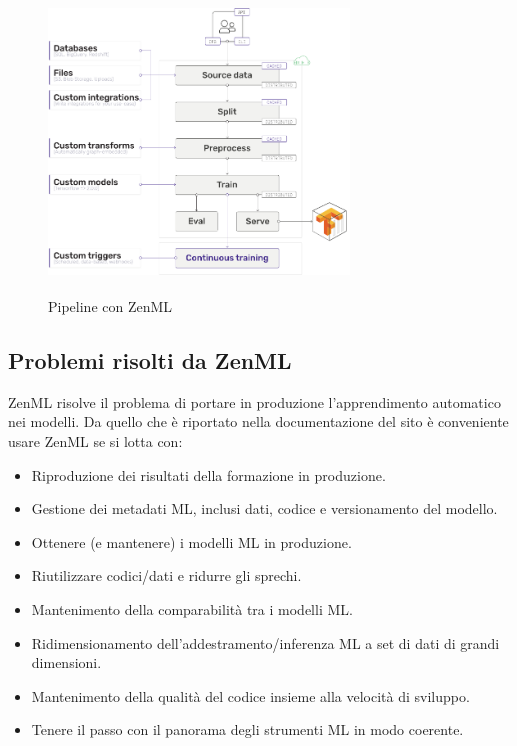 \documentclass[12pt,a4paper]{report}
\begin{document}
\begin{figure}[h!]
    \begin{center}
        \includegraphics[width=8cm,height=8cm,keepaspectratio]{ZenML-schema}
    \end{center}
    \caption{Pipeline con ZenML}
    \label{fig:ZenML-schema}
\end{figure}

\subsection{Problemi risolti da ZenML}
ZenML risolve il problema di portare in produzione l'apprendimento automatico nei modelli. Da quello che è riportato nella documentazione del sito è conveniente usare ZenML se si lotta con: \cite{ZenML}
\begin{itemize}
    \item Riproduzione dei risultati della formazione in produzione.
    \item Gestione dei metadati ML, inclusi dati, codice e versionamento del modello.
    \item Ottenere (e mantenere) i modelli ML in produzione.
    \item Riutilizzare codici/dati e ridurre gli sprechi.
    \item Mantenimento della comparabilità tra i modelli ML.
    \item Ridimensionamento dell'addestramento/inferenza ML a set di dati di grandi dimensioni.
    \item Mantenimento della qualità del codice insieme alla velocità di sviluppo.
    \item Tenere il passo con il panorama degli strumenti ML in modo coerente.
\end{itemize}
\end{document}
